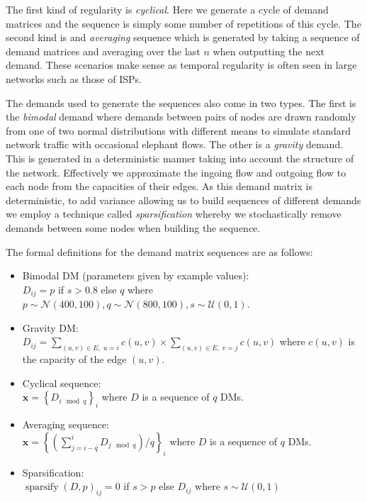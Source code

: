 The first kind of regularity is \emph{cyclical}. Here we generate a cycle of demand matrices and the sequence is simply some number of repetitions of this cycle. The second kind is and \emph{averaging} sequence which is generated by taking a sequence of demand matrices and averaging over the last $n$ when outputting the next demand. These scenarios make sense as temporal regularity is often seen in large networks such as those of ISPs\cite{fortz2002optimizing}.

The demands used to generate the sequences also come in two types. The first is the \emph{bimodal}\cite{medina2002traffic} demand where demands between pairs of nodes are drawn randomly from one of two normal distributions with different means to simulate standard network traffic with occasional elephant flows. The other is a \emph{gravity} demand\cite{roughan2002experience}. This is generated in a deterministic manner taking into account the structure of the network. Effectively we approximate the ingoing flow and outgoing flow to each node from the capacities of their edges. As this demand matrix is deterministic, to add variance allowing us to build sequences of different demands we employ a technique called \emph{sparsification} whereby we stochastically remove demands between some nodes when building the sequence.

The formal definitions for the demand matrix sequences are as follows:
\begin{itemize}
  \item Bimodal DM (parameters given by example values):\\
    $D_{ij} = p$ if $s > 0.8$ else $q$ where $p \sim \mathcal{N}(400, 100), q \sim \mathcal{N}(800, 100), s \sim \mathcal{U}(0,1)$.
  \item Gravity DM:\\
    $D_{ij} = \sum_{(u, v) \in E,\; u = i }{c(u,v)} \times \sum_{(u, v) \in E,\; v = j }{c(u, v)}$ where $c(u,v)$ is the capacity of the edge $(u,v)$.
  \item Cyclical sequence:\\
    $\bm{x} = \left\{ D_{i \mod q} \right\}_{i}$ where $D$ is a sequence of $q$ DMs.
  \item Averaging sequence:\\
    $\bm{x} = \left\{\left(\sum_{j=i-q}^{i}{D_{j \mod q}}\right) / q \right\}_{i}$ where $D$ is a sequence of $q$ DMs.
  \item Sparsification:\\
    $\operatorname{sparsify}(D, p)_{ij} = 0$ if $s > p$ else $D_{ij}$ where $s \sim \mathcal{U}(0,1)$
\end{itemize}

